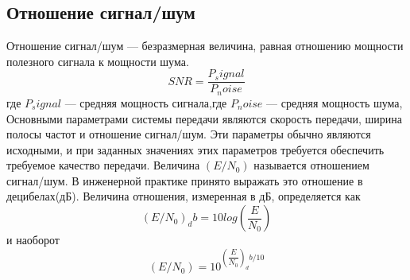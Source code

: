 \subsection{Отношение сигнал/шум}
Отношение сигнал/шум --- безразмерная величина, равная отношению мощности полезного сигнала к мощности шума.
\begin{equation}
SNR= \dfrac{P_signal}{P_noise}
\end{equation} 
где $P_signal$ --- средняя мощность сигнала,где $P_noise$ --- средняя мощность шума,
Основными параметрами системы передачи являются скорость передачи, ширина полосы частот и отношение сигнал/шум. Эти параметры обычно являются исходными, и при заданных значениях этих параметров требуется обеспечить требуемое качество передачи.
Величина
$(E/N_0)$ называется отношением сигнал/шум.  В инженерной практике принято выражать это отношение в децибелах(дБ).  Величина отношения, измеренная в дБ, определяется как
\begin{equation}
(E/N_0)_db=10log⁡(\dfrac{E}{N_{0}})
\end{equation} 
и наоборот
\begin{equation}
(E/N_0)=10^{(\dfrac{E}{N_{0}})_db/10}   
\end{equation} 